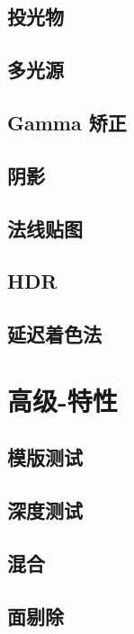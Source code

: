\documentclass[UTF8,a4paper,12pt]{ctexbook}
\begin{document}
	\section{投光物}
	
	\section{多光源}
	
	\section{Gamma 矫正}
	
	\section{阴影}
	
	\section{法线贴图}
	
	\section{HDR}
	
	\section{延迟着色法}
	



\chapter{高级-特性}
	\section{模版测试}
	
	
	\section{深度测试}
	
	
	\section{混合}
	
	
	\section{面剔除}
	
\end{document}
